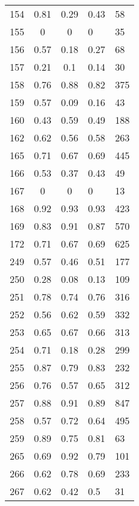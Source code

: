 \begin{longtable}[c]{|l|c|c|l|l|}
	154      & 0.81      & 0.29   & 0.43     & 58      \\
	155      & 0         & 0      & 0        & 35      \\
	156      & 0.57      & 0.18   & 0.27     & 68      \\
	157      & 0.21      & 0.1    & 0.14     & 30      \\
	158      & 0.76      & 0.88   & 0.82     & 375     \\
	159      & 0.57      & 0.09   & 0.16     & 43      \\
	160      & 0.43      & 0.59   & 0.49     & 188     \\
	162      & 0.62      & 0.56   & 0.58     & 263     \\
	165      & 0.71      & 0.67   & 0.69     & 445     \\
	166      & 0.53      & 0.37   & 0.43     & 49      \\
	167      & 0         & 0      & 0        & 13      \\
	168      & 0.92      & 0.93   & 0.93     & 423     \\
	169      & 0.83      & 0.91   & 0.87     & 570     \\
	172      & 0.71      & 0.67   & 0.69     & 625     \\
	249      & 0.57      & 0.46   & 0.51     & 177     \\
	250      & 0.28      & 0.08   & 0.13     & 109     \\
	251      & 0.78      & 0.74   & 0.76     & 316     \\
	252      & 0.56      & 0.62   & 0.59     & 332     \\
	253      & 0.65      & 0.67   & 0.66     & 313     \\
	254      & 0.71      & 0.18   & 0.28     & 299     \\
	255      & 0.87      & 0.79   & 0.83     & 232     \\
	256      & 0.76      & 0.57   & 0.65     & 312     \\
	257      & 0.88      & 0.91   & 0.89     & 847     \\
	258      & 0.57      & 0.72   & 0.64     & 495     \\
	259      & 0.89      & 0.75   & 0.81     & 63      \\
	265      & 0.69      & 0.92   & 0.79     & 101     \\
	266      & 0.62      & 0.78   & 0.69     & 233     \\
	267      & 0.62      & 0.42   & 0.5      & 31      \\

\end{longtable}
